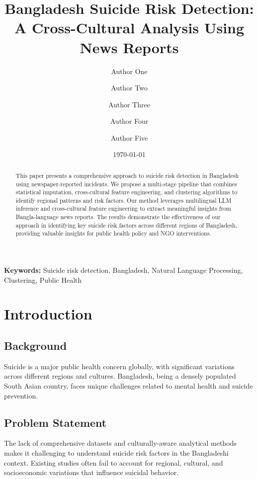 \documentclass[12pt,a4paper]{article}
\title{\textbf{Bangladesh Suicide Risk Detection: A Cross-Cultural Analysis Using News Reports}}
\author[1]{Author One}
\author[1]{Author Two}
\author[1]{Author Three}
\author[1]{Author Four}
\author[1]{Author Five}
\affil[1]{Department of Computer Science, University Name, Bangladesh}
\date{\today}
\begin{document}
\maketitle

\begin{abstract}
This paper presents a comprehensive approach to suicide risk detection in Bangladesh using newspaper-reported incidents. We propose a multi-stage pipeline that combines statistical imputation, cross-cultural feature engineering, and clustering algorithms to identify regional patterns and risk factors. Our method leverages multilingual LLM inference and cross-cultural feature engineering to extract meaningful insights from Bangla-language news reports. The results demonstrate the effectiveness of our approach in identifying key suicide risk factors across different regions of Bangladesh, providing valuable insights for public health policy and NGO interventions.
\end{abstract}

\vspace{1em}
\noindent\textbf{Keywords:} Suicide risk detection, Bangladesh, Natural Language Processing, Clustering, Public Health

\tableofcontents
\newpage

\section{Introduction}

\subsection{Background}
Suicide is a major public health concern globally, with significant variations across different regions and cultures. Bangladesh, being a densely populated South Asian country, faces unique challenges related to mental health and suicide prevention.

\subsection{Problem Statement}
The lack of comprehensive datasets and culturally-aware analytical methods makes it challenging to understand suicide risk factors in the Bangladeshi context. Existing studies often fail to account for regional, cultural, and socioeconomic variations that influence suicidal behavior.
\end{document}
